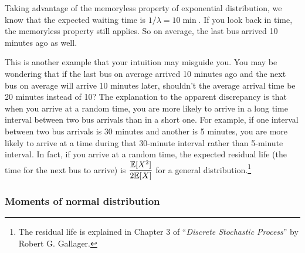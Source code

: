 \begin{solution}
Taking advantage of the memoryless property of exponential distribution, we know that
the expected waiting time is $1/\lambda=10\min$. If you look back in time, the
memoryless property still applies. So on average, the last bus arrived 10 minutes ago as
well.


This is another example that your intuition may misguide you. You may be wondering that
if the last bus on average arrived 10 minutes ago and the next bus on average will arrive
10 minutes later, shouldn't the average arrival time be 20 minutes instead of 10? The
explanation to the apparent discrepancy is that when you arrive at a random time, you are
more likely to arrive in a long time interval between two bus arrivals than in a short one.
For example, if one interval between two bus arrivals is 30 minutes and another is 5
minutes, you are more likely to arrive at a time during that 30-minute interval rather
than 5-minute interval. In fact, if you arrive at a random time, the expected residual
life (the time for the next bus to arrive) is $\dfrac{\mathbb{E}[X^2]}{2\mathbb{E}[X]}$ for a general
distribution.\footnote[25]{The residual life is explained in Chapter 3 of ``\textit{Discrete Stochastic Process}'' by Robert G. Gallager.}
\end{solution}

\subsubsection{Moments of normal distribution}

